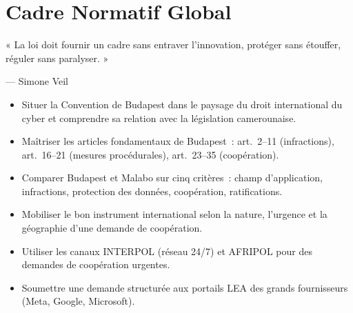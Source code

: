 
\chapter{Cadre Normatif Global}
\label{chap:norm-glob}

\epigraph{%
    « La loi doit fournir un cadre sans entraver l'innovation,
    protéger sans étouffer, réguler sans paralyser. »%
}{--- Simone Veil}


\begin{boxobjectifs}
\begin{itemize}
    \item Situer la Convention de Budapest dans le paysage du droit
          international du cyber et comprendre sa relation avec la
          législation camerounaise.
    \item Maîtriser les articles fondamentaux de Budapest~: art.~2--11
          (infractions), art.~16--21 (mesures procédurales),
          art.~23--35 (coopération).
    \item Comparer Budapest et Malabo sur cinq critères~: champ d'application,
          infractions, protection des données, coopération, ratifications.
    \item Mobiliser le bon instrument international selon la nature,
          l'urgence et la géographie d'une demande de coopération.
    \item Utiliser les canaux INTERPOL (réseau 24/7) et AFRIPOL
          pour des demandes de coopération urgentes.
    \item Soumettre une demande structurée aux portails LEA des grands
          fournisseurs (Meta, Google, Microsoft).
\end{itemize}
\end{boxobjectifs}

